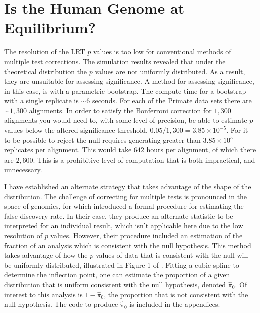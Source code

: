 % 







\section{Is the Human Genome at Equilibrium?}




The resolution of the LRT $p$ values is too low for conventional methods of multiple test corrections. The simulation results revealed that under the theoretical distribution the $p$ values are not uniformly distributed. As a result, they are unsuitable for assessing significance. A method for assessing significance, in this case, is with a parametric bootstrap. The compute time for a bootstrap with a single replicate is ${\sim} 6$ seconds. For each of the Primate data sets there are ${\sim} 1,300$ alignments. In order to satisfy the Bonferroni correction for $1,300$ alignments you would need to, with some level of precision, be able to estimate $p$ values below the altered significance threshold, $0.05/1,300 = 3.85{\times}10^{-5}$. For it to be possible to reject the null requires generating greater than $3.85{\times}10^{5}$ replicates per alignment. This would take $642$ hours per alignment, of which there are $2,600$. This is a prohibitive level of computation that is both impractical, and unnecessary. 

I have established an alternate strategy that takes advantage of the shape of the distribution. The challenge of correcting for multiple tests is pronounced in the space of genomics, for which \cite{Storey2003StatisticalStudies} introduced a formal procedure for estimating the false discovery rate. In their case, they produce an alternate statistic to be interpreted for an individual result, which isn't applicable here due to the low resolution of $p$ values. However, their procedure included an estimation of the fraction of an analysis which is consistent with the null hypothesis. This method takes advantage of how the $p$ values of data that is consistent with the null will be uniformly distributed, illustrated in Figure 1 of \cite{Storey2003StatisticalStudies}. Fitting a cubic spline to determine the inflection point, one can estimate the proportion of a given distribution that is uniform consistent with the null hypothesis, denoted $\hat \pi_{0}$. Of interest to this analysis is $1 -\hat \pi_{0}$, the proportion that is not consistent with the null hypothesis. The code to produce $\hat \pi_{0}$ is included in the appendices. 

